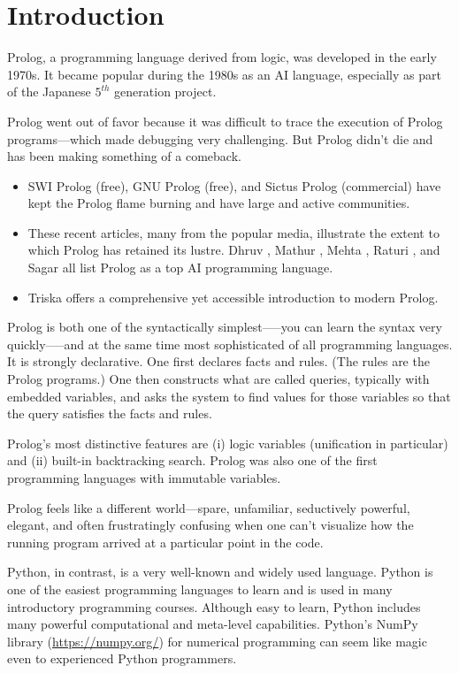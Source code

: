 \section{Introduction}

Prolog, a programming language derived from logic, was developed in the early 1970s. It became popular during the 1980s as an AI language, especially as part of the Japanese $5^{th}$ generation project.

Prolog went out of favor because it was difficult to trace the execution of Prolog programs---which made debugging very challenging. But Prolog didn't die and has been making something of a comeback. 
\begin{itemize}
    \item SWI Prolog (free), GNU Prolog (free), and Sictus Prolog (commercial) have kept the Prolog flame burning and have large and active communities.
    \item  These recent articles, many from the popular media, illustrate the extent to which Prolog has retained its lustre. Dhruv \cite{Dhruv2018}, Mathur \cite{Mathur2018}, Mehta \cite{Mehta2018},  Raturi \cite{Raturi2019}, and Sagar \cite{Sagar2019} all list Prolog as a top AI programming language. 
    \item Triska \cite{Triska2020} offers a comprehensive yet accessible introduction to modern Prolog. 
\end{itemize}

Prolog is both one of the syntactically simplest—--you can learn the syntax very quickly--—and at the same time most sophisticated of all programming languages. It is strongly declarative. One first declares facts and rules. (The rules are the Prolog programs.) One then constructs what are called queries, typically with embedded variables, and asks the system to find values for those variables so that the query satisfies the facts and rules. 

Prolog's most distinctive features are (i) logic variables (unification in particular) and (ii) built-in backtracking search. Prolog was also one of the first programming languages with immutable variables. 

Prolog feels like a different world---spare, unfamiliar, seductively powerful, elegant, and often frustratingly confusing when one can't visualize how the running program arrived at a particular point in the code. 

Python, in contrast, is a very well-known and widely used language. Python is one of the easiest programming languages to learn and is used in many introductory programming courses. Although easy to learn, Python includes many powerful computational and meta-level capabilities. Python's NumPy library (\url{https://numpy.org/}) for numerical programming can seem like magic even to experienced Python programmers. 

